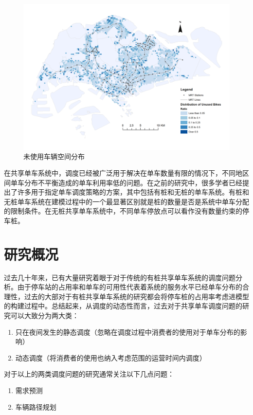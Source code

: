 \documentclass[]{tongjithesis}
\numberwithin{equation}{chapter}
\begin{document}
\begin{figure}[H]
	\centering
	\includegraphics[width= 0.9 \textwidth]{figures_main/unused_spatial_distribution_ratio.png}
	\caption{未使用车辆空间分布}
	\label{spatial_unused}
\end{figure}

在共享单车系统中，调度已经被广泛用于解决在单车数量有限的情况下，不同地区间单车分布不平衡造成的单车利用率低的问题。在之前的研究中，很多学者已经提出了许多用于指定单车调度策略的方案，其中包括有桩和无桩的单车系统。有桩和无桩单车系统在建模过程中的一个最显著区别就是桩的数量是否是系统中单车分配的限制条件。在无桩共享单车系统中，不同单车停放点可以看作没有数量约束的停车桩。

\section{研究概况}
过去几十年来，已有大量研究着眼于对于传统的有桩共享单车系统的调度问题分析。由于停车站的占用率和单车的可用性代表着系统的服务水平已经单车分布的合理性，过去的大部对于有桩共享单车系统的研究都会将停车桩的占用率考虑进模型的构建过程中。总结起来，从调度的动态性而言，过去对于共享单车调度问题的研究可以大致分为两大类：\par
\begin{enumerate}
	\item 只在夜间发生的静态调度（忽略在调度过程中消费者的使用对于单车分布的影响）
	\item 动态调度（将消费者的使用也纳入考虑范围的运营时间内调度）
\end{enumerate}

对于以上的两类调度问题的研究通常关注以下几点问题：
\begin{enumerate}
	\item 需求预测
	\item 车辆路径规划
\end{enumerate}
\end{document}
